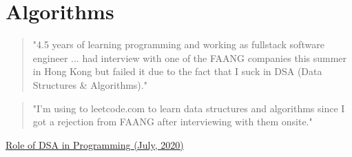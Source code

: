 \section{Algorithms}


\begin{quote}
	"4.5 years of learning programming and working as fullstack software engineer ... had interview with one of the FAANG companies this summer in Hong Kong but failed it due to the fact that I suck in DSA (Data Structures \& Algorithms)."
\end{quote}

\begin{quote}
	"I'm using to leetcode.com to learn data structures
	and algorithms since I got a rejection from FAANG after interviewing with them onsite."
\end{quote}

\href{https://blog.codechef.com/2020/07/24/the-role-of-data-structure-and-algorithms-in-programming/}{Role of DSA in Programming (July, 2020)}


